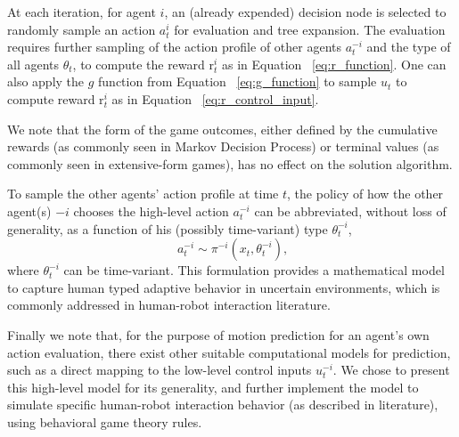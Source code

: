 \documentclass[letterpaper, 10 pt, conference]{ieeeconf}  %
\begin{document}
At each iteration, for agent $i$, an (already expended) decision node is 
selected to randomly sample an action $a^i_t$ for evaluation and tree 
expansion. The evaluation requires further sampling of the action profile of 
other agents $a^{-i}_t$ and the type of all agents $\theta_t$, to compute the 
reward r$^i_t$ as in Equation ~\ref{eq:r_function}. One can also apply the $g$ 
function from Equation ~\ref{eq:g_function} to sample $u_t$ to compute reward 
r$^i_t$ as in Equation ~\ref{eq:r_control_input}.

We note that the form of the game outcomes, either defined by the cumulative 
rewards (as commonly seen in Markov Decision Process) or terminal values (as 
commonly seen in extensive-form games), has no effect on the solution algorithm. 

To sample the other agents' action profile at time $t$, the policy of how 
the other agent(s) $-i$ chooses the high-level action $a^{-i}_t$ can be 
abbreviated, without loss of generality, as a function of his (possibly 
time-variant) type 
$\theta^{-i}_t$,
\begin{equation}~\label{eq:pi}
  a^{-i}_t \sim \pi^{-i}(x_t,\theta^{-i}_t),
\end{equation}
where $\theta^{-i}_t$ can be time-variant. This formulation provides a 
mathematical model to capture human typed adaptive behavior in uncertain 
environments, which is commonly addressed in human-robot interaction literature.  

Finally we note that, for the purpose of motion prediction for an agent's own 
action evaluation, there exist other suitable computational models for 
prediction, such as a direct mapping to the low-level control inputs 
$u^{-i}_t$. We chose to present this high-level model for its generality, and 
further implement the model to simulate specific human-robot interaction 
behavior (as described in literature), using behavioral game theory rules.  
\end{document}
